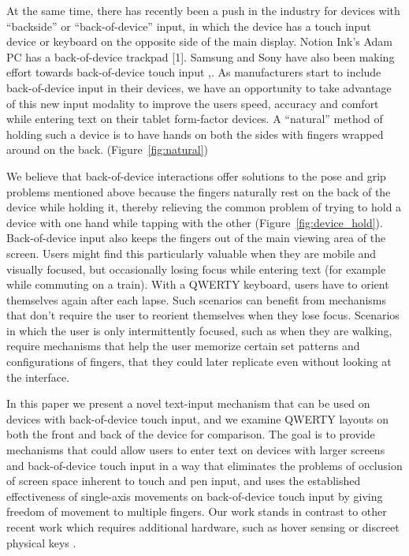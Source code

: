 At the same time, there has recently been a push in the industry for
devices with ``backside'' or ``back-of-device'' input, in which the
device has a touch input device or keyboard on the opposite side of
the main display. Notion Ink's Adam PC has a back-of-device trackpad
[1]. Samsung and Sony have also been making effort towards back-of-device
touch input \cite{Samsung},\cite{Sony}. As manufacturers start to
include back-of-device input in their devices, we have an opportunity to
take advantage of this new input modality to improve the users speed,
accuracy and comfort while entering text on their tablet form-factor
devices. A ``natural'' method of holding such a device is to have hands
on both the sides with fingers wrapped around on the
back. \cite{Vogel} (Figure~\ref{fig:natural})

We believe that back-of-device interactions offer solutions to the
pose and grip problems mentioned above because the fingers naturally
rest on the back of the device while holding it, thereby relieving the
common problem of trying to hold a device with one hand while tapping
with the other (Figure~\ref{fig:device_hold}).  Back-of-device input
also keeps the fingers out of the main viewing area of the screen.
Users might find this particularly valuable when they are mobile and
visually focused, but occasionally losing focus while entering text
(for example while commuting on a train).  With a QWERTY keyboard,
users have to orient themselves again after each lapse. Such scenarios
can benefit from mechanisms that don't require the user to reorient
themselves when they lose focus.  Scenarios in which the user is only
intermittently focused, such as when they are walking, require
mechanisms that help the user memorize certain set patterns and
configurations of fingers, that they could later replicate even
without looking at the interface.

In this paper we present a novel text-input mechanism that can be used
on devices with back-of-device touch input, and we examine QWERTY
layouts on both the front and back of the device for comparison. The
goal is to provide mechanisms that could allow users to enter text on
devices with larger screens and back-of-device touch input in a way
that eliminates the problems of occlusion of screen space inherent to
touch and pen input, and uses the established effectiveness of
single-axis movements on back-of-device touch input \cite{Wobbrock} by
giving freedom of movement to multiple fingers.  Our work stands in
contrast to other recent work which requires additional hardware, such
as hover sensing \cite{LucidTouch} or discreet physical keys
\cite{RearType}.


